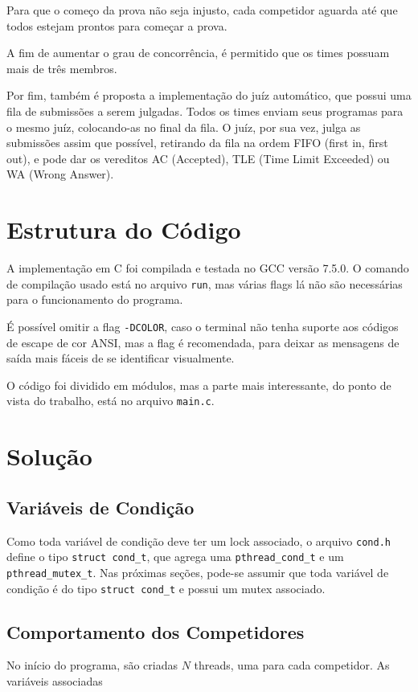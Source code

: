 \documentclass[11pt]{article}
\newcommand{\code}{\lstinline[mathescape=true]}
\begin{document}
Para que o começo da prova não seja injusto, cada competidor aguarda até que todos estejam prontos
para começar a prova.

A fim de aumentar o grau de concorrência, é permitido que os times possuam mais de três membros.

Por fim, também é proposta a implementação do juíz automático, que possui uma fila de submissões a
serem julgadas. Todos os times enviam seus programas para o mesmo juíz, colocando-as no final da
fila. O juíz, por sua vez, julga as submissões assim que possível, retirando da fila na ordem FIFO
(first in, first out), e pode dar os vereditos AC (Accepted), TLE (Time Limit Exceeded) ou WA (Wrong
Answer).

\section{Estrutura do Código}
A implementação em C foi compilada e testada no GCC versão 7.5.0. O comando de compilação usado está no
arquivo \code{run}, mas várias flags lá não são necessárias para o funcionamento do programa. 

É possível omitir a flag \code{-DCOLOR}, caso o terminal não tenha suporte aos códigos de escape de
cor ANSI\cite{ansi_color}, mas a flag é recomendada, para deixar as mensagens de saída mais fáceis de
se identificar visualmente.

O código foi dividido em módulos, mas a parte mais interessante, do ponto de vista do trabalho, está
no arquivo \code{main.c}.

\section{Solução}

\subsection{Variáveis de Condição}
Como toda variável de condição deve ter um lock associado, o arquivo \code{cond.h} define o tipo
\code{struct cond_t}, que agrega uma \code{pthread_cond_t} e um \code{pthread_mutex_t}. Nas próximas
seções, pode-se assumir que toda variável de condição é do tipo \code{struct cond_t} e possui um
mutex associado.

\subsection{Comportamento dos Competidores}
No início do programa, são criadas $N$ threads, uma para cada competidor. As variáveis associadas 
\end{document}
